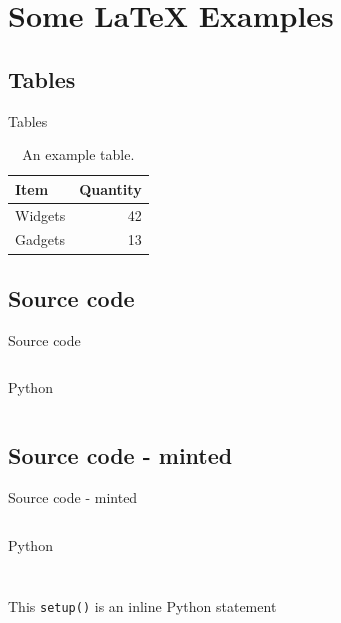 \documentclass[10pt,compress]{beamer} %
\newcommand{\python}[2][\footnotesize]{\texttt{#2}}
\begin{document}
\section{Some \LaTeX{} Examples}
\subsection{Tables}

\begin{frame}{Tables}

\begin{table}
\centering
\begin{tabular}{l|r}
Item & Quantity \\\hline
Widgets & 42 \\
Gadgets & 13
\end{tabular}
\caption{\label{tab:widgets}An example table.}
\end{table}

\end{frame}

\subsection{Source code}

\begin{frame}{Source code}
    \begin{columns}
	        \begin{block}{Python}
	        \vspace{-0.2cm}
		        
            \end{block}
		    
    \end{columns}
\end{frame}

\subsection{Source code - minted}

\begin{frame}{Source code - minted}
    \begin{columns}
	        \begin{block}{Python}
	        \vspace{-0.2cm}
		\inputminted[highlightlines={5-6}]{python}{code/hello.py}
            	\end{block}
		    \inputminted[highlightlines={3,5}]{C}{code/hello.c}
    \end{columns}

    \bigskip

    This \python{setup()} is an inline Python statement
\end{frame}
\end{document}

